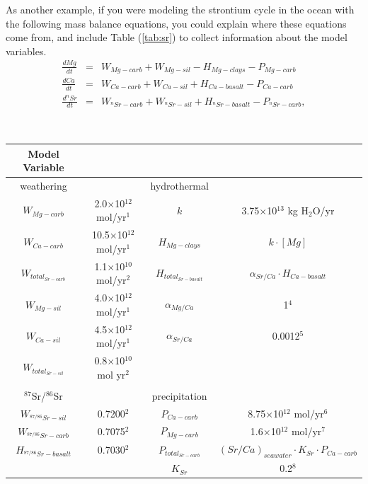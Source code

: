 \documentclass[11pt]{report}
\begin{document}
As another example, if you were modeling the strontium cycle in the ocean with the following mass balance equations, you could explain where these equations come from, and include Table (\ref{tab:sr}) to collect information about the model variables.
\vspace{-10pt}
\begin{eqnarray}
\frac{dMg}{dt} &=& W_{Mg-carb} + W_{Mg-sil} - H_{Mg-clays} - P_{Mg-carb} \\
\frac{dCa}{dt} &=& W_{Ca-carb} + W_{Ca-sil} + H_{Ca-basalt} - P_{Ca-carb} \\
\frac{d^{n}Sr}{dt} &=& W_{^{n}Sr-carb} + W_{^{n}Sr-sil} + H_{^{n}Sr-basalt} - P_{^{n}Sr-carb},
\end{eqnarray}
\vspace{-20pt}
\linespread{1}
\tabcolsep 2.5pt 
\begin{table}[h!]
\centering
$ $\\
\footnotesize{}
\begin{tabular}{c|c|c|c}
Model Variable & & & \\
\hline
weathering & & hydrothermal & \\
\hline
$W_{Mg-carb}$ & 2.0$\times$10$^{12}$ mol/yr$^{1}$ & $k$ & 3.75$\times$10$^{13}$ kg H$_2$O/yr \\
$W_{Ca-carb}$ & 10.5$\times$10$^{12}$ mol/yr$^{1}$ & $H_{Mg-clays}$ & $k \cdot [Mg]$ \\
$W_{total_{Sr-carb}}$ & 1.1$\times$10$^{10}$ mol/yr$^{2}$ & $H_{total_{Sr-basalt}}$ & $\alpha_{Sr/Ca} \cdot H_{Ca-basalt}$ \\
$W_{Mg-sil}$ & 4.0$\times$10$^{12}$ mol/yr$^{1}$ & $\alpha_{Mg/Ca}$ & 1$^4$ \\
$W_{Ca-sil}$ & 4.5$\times$10$^{12}$ mol/yr$^{1}$ & $\alpha_{Sr/Ca}$ & 0.0012$^{5}$ \\
$W_{total_{Sr-sil}}$ & 0.8$\times$10$^{10}$ mol yr$^{2}$ & & \\
& & & \\
$^{87}$Sr/$^{86}$Sr & & precipitation & \\
\hline
$W_{^{87/86}Sr-sil}$ & 0.7200$^2$ & $P_{Ca-carb}$ & 8.75$\times$10$^{12}$ mol/yr$^{6}$ \\
$W_{^{87/86}Sr-carb}$ & 0.7075$^2$ & $P_{Mg-carb}$ & 1.6$\times$10$^{12}$ mol/yr$^{7}$ \\
$H_{^{87/86}Sr-basalt}$ & 0.7030$^2$ & $P_{total_{Sr-carb}}$ & $(Sr/Ca)_{seawater} \cdot K_{Sr} \cdot P_{Ca-carb}$ \\
 & & $K_{Sr}$ & 0.2$^8$ \\
\end{tabular}

\end{table}
\end{document}
